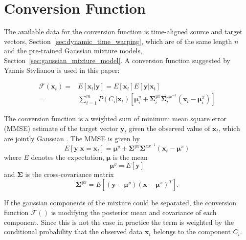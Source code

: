 \section{Conversion Function} %
\label{sec:conversion_function}
The available data for the conversion function is time-aligned source and target vectors, Section~\ref{sec:dynamic_time_warping}, which are of the same length $n$ and the pre-trained Gaussian mixture models, Section~\ref{sec:gaussian_mixture_model}. A conversion function suggested by Yannis Stylianou \etal \cite{stylianou95} is used in this paper:
\begin{defn}
	\label{defn:conversion_function}
	\begin{equation}
		\label{eq:conversion_function}
		\begin{split}
		\mathcal{F}(\mathbf{x}_t) =& E[\mathbf{x}_t\vert \mathbf{y}] = E[\mathbf{x}_t]E[\mathbf{y}\vert \mathbf{x}_t]\\
		 =& \sum_{i=1}^{m}P(C_i \vert \mathbf{x}_t)[\boldsymbol{\mu}_i^y + \mathbf{\Sigma}_i^{yx} \mathbf{\Sigma}_i^{xx^{-1}} (\mathbf{x}_t-\boldsymbol{\mu}_i^x)]
		\end{split}
	\end{equation}	
\end{defn}
The conversion function is a weighted sum of minimum mean square error (MMSE) estimate of the target vector $\mathbf{y}_t$ given the observed value of $\mathbf{x}_t$, which are jointly Gaussian \cite{stylianou98}. The MMSE is given by \cite{taletek}
\begin{equation}
	\label{eq:mmse}
	E[\mathbf{y}\vert \mathbf{x}=\mathbf{x}_t] = \boldsymbol{\mu}^y + \mathbf{\Sigma}^{yx} \mathbf{\Sigma}^{xx^{-1}} (\mathbf{x}_t-\boldsymbol{\mu}^x)
\end{equation}
where $E$ denotes the expectation, $\boldsymbol{\mu}$ is the mean
\begin{equation}
	\boldsymbol{\mu}^y = E[\mathbf{y}]
\end{equation}
and $\mathbf{\Sigma}$ is the cross-covariance matrix
\begin{equation}
	\mathbf{\Sigma}^{yx} = E[(\mathbf{y}-\boldsymbol{\mu}^y)(\mathbf{x}-\boldsymbol{\mu}^x)^T].
\end{equation}

If the gaussian components of the mixture could be separated, the conversion function $\mathcal{F}()$ is modifying the posterior mean and covariance of each component. Since this is not the case in practice the term is weighted by the conditional probability that the observed data $\mathbf{x}_t$ belongs to the component $C_i$.

